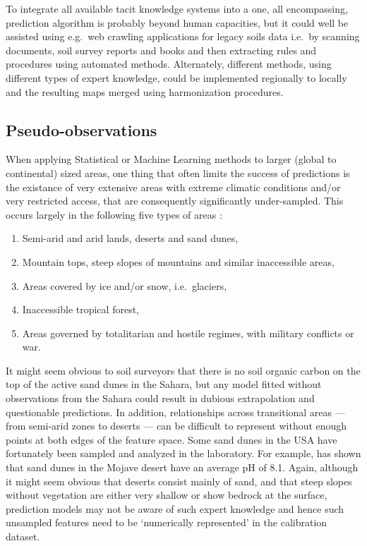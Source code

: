\documentclass[graybox,natbib,nospthms,UStrade]{svmono}
\begin{document}
To integrate all available tacit knowledge systems into a one, all encompassing,
prediction algorithm is probably beyond human capacities, but it could
well be assisted using e.g.~web crawling applications for legacy soils
data i.e.~by scanning documents, soil survey reports and books and then
extracting rules and procedures using automated methods. Alternately,
different methods, using different types of expert knowledge, could be
implemented regionally to locally and the resulting maps merged using
harmonization procedures.

\hypertarget{pseudo-observations}{%
\subsection{Pseudo-observations}\label{pseudo-observations}}

When applying Statistical or Machine Learning methods to larger (global to continental) sized areas,
one thing that often limits the success of predictions is the existance of very extensive areas with extreme
climatic conditions and/or very restricted access, that are consequently
significantly under-sampled. This occurs largely in the following five
types of areas \citep{Hengl2017SoilGrids250m}:

\begin{enumerate}
\def\labelenumi{\arabic{enumi}.}
\item
  Semi-arid and arid lands, deserts and sand dunes,
\item
  Mountain tops, steep slopes of mountains and similar inaccessible
  areas,
\item
  Areas covered by ice and/or snow, i.e.~glaciers,
\item
  Inaccessible tropical forest,
\item
  Areas governed by totalitarian and hostile regimes, with military
  conflicts or war.
\end{enumerate}

It might seem obvious to soil surveyors that there is no soil organic
carbon on the top of the active sand dunes in the Sahara, but any model
fitted without observations from the Sahara could result in dubious
extrapolation and questionable predictions. In addition, relationships
across transitional areas --- from semi-arid zones to deserts --- can be
difficult to represent without enough points at both edges of the
feature space. Some sand dunes in the USA have fortunately been sampled and
analyzed in the laboratory. For example, \citet{Lei1998} has shown that
sand dunes in the Mojave desert have an average pH of 8.1. Again, although it might seem obvious that deserts
consist mainly of sand, and that steep slopes without vegetation are
either very shallow or show bedrock at the surface, prediction models may not be
aware of such expert knowledge and hence such unsampled features need to be
`numerically represented' in the calibration dataset.
\end{document}
